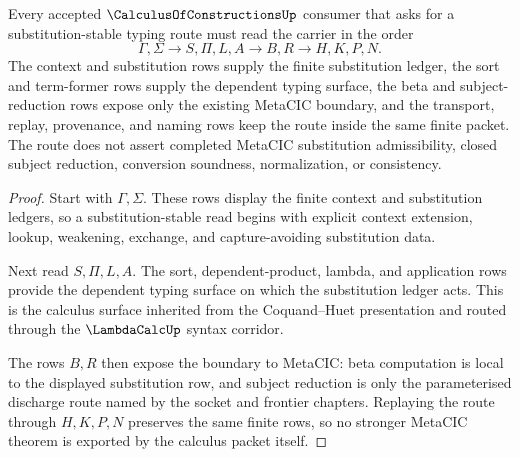\begin{theorem}
\label{thm:calculus-of-constructions-substitution-typing-route}
Every accepted $\CalculusOfConstructionsUp$ consumer that asks for a substitution-stable typing route must read the carrier in the order
$$
\Gamma,\Sigma \longrightarrow S,\Pi,L,A \longrightarrow B,R \longrightarrow H,K,P,N.
$$
The context and substitution rows supply the finite substitution ledger, the sort and term-former rows supply the dependent typing surface, the beta and subject-reduction rows expose only the existing MetaCIC boundary, and the transport, replay, provenance, and naming rows keep the route inside the same finite packet. The route does not assert completed MetaCIC substitution admissibility, closed subject reduction, conversion soundness, normalization, or consistency.
\end{theorem}
\begin{proof}
Start with $\Gamma,\Sigma$. These rows display the finite context and substitution ledgers, so a substitution-stable read begins with explicit context extension, lookup, weakening, exchange, and capture-avoiding substitution data.

Next read $S,\Pi,L,A$. The sort, dependent-product, lambda, and application rows provide the dependent typing surface on which the substitution ledger acts. This is the calculus surface inherited from the Coquand--Huet presentation and routed through the $\LambdaCalcUp$ syntax corridor.

The rows $B,R$ then expose the boundary to MetaCIC: beta computation is local to the displayed substitution row, and subject reduction is only the parameterised discharge route named by the socket and frontier chapters. Replaying the route through $H,K,P,N$ preserves the same finite rows, so no stronger MetaCIC theorem is exported by the calculus packet itself.
\end{proof}


